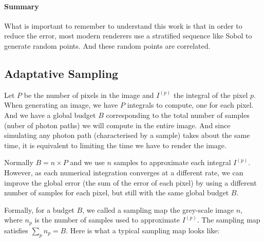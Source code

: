 \documentclass{classeENS}
\begin{document}
\paragraph*{Summary} What is important to remember to understand this work 
is that in order to reduce the error, most modern renderers use a 
stratified sequence like Sobol \cite{renderman} to generate random points.
And these random points are correlated.

\subsection{Adaptative Sampling}

\par Let $P$ be the number of pixels in the image and $I^{(p)}$ the integral of 
the pixel $p$. When generating an image, we have $P$ integrals to compute, 
one for each pixel. And we have a global budget $B$ corresponding to the 
total number of samples (nuber of photon paths) we will compute in the entire 
image. And since simulating any photon path (characterised by a sample) takes about the 
same time, it is equivalent to limiting the time we have to render the image.

\par Normally $B=n\times P$ and we use $n$ samples to approximate each integral 
$I^{(p)}$. However, as each numerical integration converges at a different 
rate, we can improve the global error (the sum of the error of each pixel) 
by using a different number of samples for each pixel, but still with the same 
global budget $B$.

\par Formally, for a budget $B$, we called a sampling map the grey-scale 
image $n$, where $n_p$ is the number of samples used to approximate 
$I^{(p)}$. The sampling map satisfies $\sum_{p} n_p = B$. Here is what a 
typical sampling map looks like:
\end{document}
